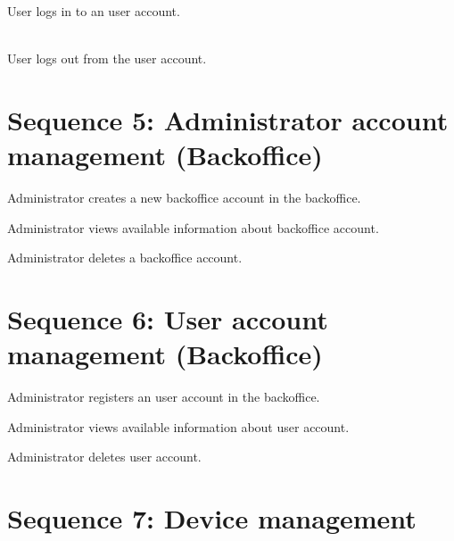User logs in to an \gls{user account}.
\\[12pt]

\resizebox{\linewidth}{!}{}	
\\[12pt]

\resizebox{\linewidth}{!}{}

User logs out from the \gls{user account}.


\section{Sequence 5: Administrator account management (Backoffice)}
\resizebox{\linewidth}{!}{}

Administrator creates a new \gls{backoffice account} in the \gls{backoffice}.
\\[12pt]
\resizebox{\linewidth}{!}{}

Administrator views available information about \gls{backoffice account}.
\\[12pt]
\resizebox{\linewidth}{!}{}

Administrator deletes a \gls{backoffice account}.

\section{Sequence 6: User account management (Backoffice)}
\resizebox{\linewidth}{!}{}

Administrator registers an \gls{user account} in the \gls{backoffice}.
\\[12pt]
\resizebox{\linewidth}{!}{}

Administrator views available information about \gls{user account}.
\\[12pt]
\resizebox{\linewidth}{!}{}

Administrator deletes \gls{user account}.


\section{Sequence 7: Device management}

\resizebox{\linewidth}{!}{}


